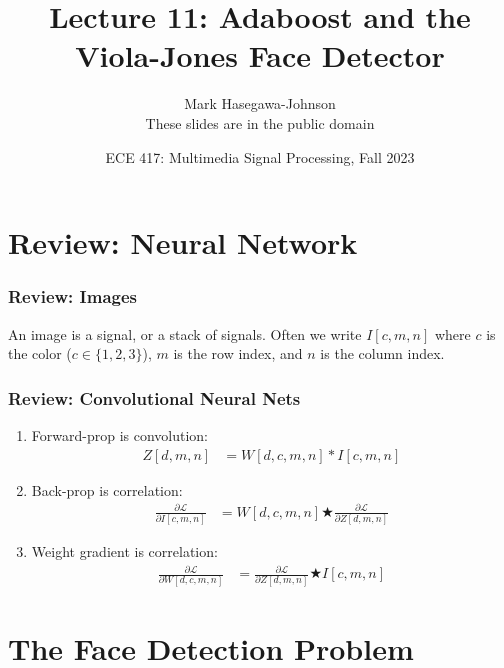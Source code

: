 \documentclass{beamer}
\title{Lecture 11: Adaboost and the Viola-Jones Face Detector}
\author{Mark Hasegawa-Johnson\\These slides are in the public domain}
\date{ECE 417: Multimedia Signal Processing, Fall 2023}
\begin{document}
\begin{frame}
  \maketitle
\end{frame}

\begin{frame}
  \tableofcontents
\end{frame}


\section[Review]{Review: Neural Network}
\setcounter{subsection}{1}

\begin{frame}
  \frametitle{Review: Images}

  An image is a signal, or a stack of signals.  Often we write
  $I[c,m,n]$ where $c$ is the color ($c\in\{1,2,3\}$), $m$ is the row
  index, and $n$ is the column index.
\end{frame}
  
\begin{frame}
  \frametitle{Review: Convolutional Neural Nets}
  \begin{enumerate}
  \item Forward-prop is convolution:
    \begin{align*}
      Z[d,m,n] &= W[d,c,m,n] \ast I[c,m,n]
    \end{align*}
  \item Back-prop is correlation:
    \begin{align*}
      \frac{\partial{\mathcal L}}{\partial I[c,m,n]} &=
      W[d,c,m,n] \bigstar \frac{\partial{\mathcal L}}{\partial Z[d,m,n]}
    \end{align*}
  \item Weight gradient is correlation:
    \begin{align*}
      \frac{\partial{\mathcal L}}{\partial W[d,c,m,n]} &=
      \frac{\partial{\mathcal L}}{\partial Z[d,m,n]} \bigstar I[c,m,n]
    \end{align*}
  \end{enumerate}
\end{frame}

\section[Detection]{The Face Detection Problem}
\setcounter{subsection}{1}
\end{document}
